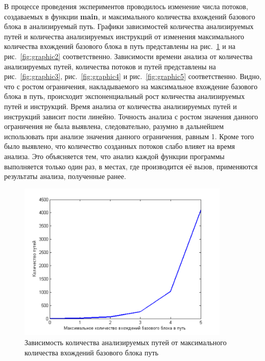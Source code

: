 

В процессе проведения экспериментов проводилось изменение числа потоков, создаваемых в функции \textbf{main}, и максимального количества вхождений базового блока в анализируемый путь. Графики зависимостей количества анализируемых путей и количества анализируемых инструкций от изменения максимального количества вхождений базового блока в путь представлены на рис.~\ref{fig:graphic1} и на рис.~\ref{fig:graphic2} соответственно. Зависимости времени анализа от количества анализируемых путей, количества потоков и путей представлены на рис.~\ref{fig:graphic3}, рис.~\ref{fig:graphic4} и рис.~\ref{fig:graphic5} соответственно. Видно, что с ростом ограничения, накладываемого на максимальное вхождение базового блока в путь, происходит экспоненциальный рост количества анализируемых путей и инструкций. Время анализа от количества анализируемых путей и инструкций зависит пости линейно. Точность анализа с ростом значения данного ограничения не была выявлена, следовательно, разумно  в дальнейшем использовать при анализе значения данного ограничения, равным 1. Кроме того было выявлено, что количество созданных потоков слабо влияет на время анализа. Это объясняется тем, что анализ каждой функции программы выполняется только один раз, в местах, где производится её вызов, применяются результаты анализа, полученные ранее.

\begin{figure}
  \centering
  \includegraphics[width=0.9\textwidth]{inc/png/graphic1}
  \caption{Зависимость количества анализируемых путей от максимального количества вхождений базового блока путь}
  \label{fig:graphic1}
\end{figure}

